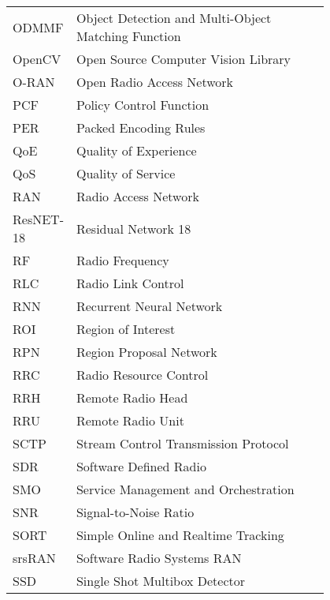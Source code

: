 \begin{flushleft}
\begin{tabular}{l p{0.8\linewidth}}
        ODMMF & Object Detection and Multi-Object Matching Function \\
        OpenCV & Open Source Computer Vision Library \\
        O-RAN & Open Radio Access Network \\
        PCF & Policy Control Function \\
        PER & Packed Encoding Rules \\
        QoE & Quality of Experience \\
        QoS & Quality of Service \\
        RAN & Radio Access Network \\
        ResNET-18 & Residual Network 18 \\
        RF & Radio Frequency \\
        RLC & Radio Link Control \\
        RNN & Recurrent Neural Network \\
        ROI & Region of Interest \\
        RPN & Region Proposal Network \\
        RRC & Radio Resource Control \\
        RRH & Remote Radio Head \\
        RRU & Remote Radio Unit \\
        SCTP & Stream Control Transmission Protocol \\
        SDR & Software Defined Radio \\
        SMO & Service Management and Orchestration \\
        SNR & Signal-to-Noise Ratio \\
        SORT & Simple Online and Realtime Tracking \\
        srsRAN & Software Radio Systems RAN \\
        SSD & Single Shot Multibox Detector \\
    \end{tabular}
\end{flushleft}
